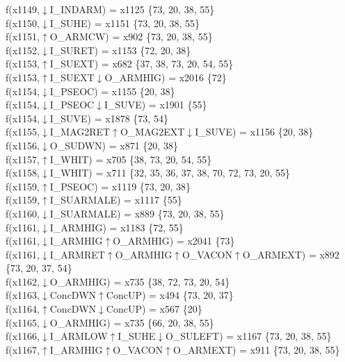 f(x1149,$\downarrow$I\_INDARM) = x1125 \{73, 20, 38, 55\} \\  
f(x1150,$\downarrow$I\_SUHE) = x1151 \{73, 20, 38, 55\} \\  
f(x1151,$\uparrow$O\_ARMCW) = x902 \{73, 20, 38, 55\} \\  
f(x1152,$\downarrow$I\_SURET) = x1153 \{72, 20, 38\} \\  
f(x1153,$\uparrow$I\_SUEXT) = x682 \{37, 38, 73, 20, 54, 55\} \\  
f(x1153,$\uparrow$I\_SUEXT$\downarrow$O\_ARMHIG) = x2016 \{72\} \\  
f(x1154,$\downarrow$I\_PSEOC) = x1155 \{20, 38\} \\  
f(x1154,$\downarrow$I\_PSEOC$\downarrow$I\_SUVE) = x1901 \{55\} \\  
f(x1154,$\downarrow$I\_SUVE) = x1878 \{73, 54\} \\  
f(x1155,$\downarrow$I\_MAG2RET$\uparrow$O\_MAG2EXT$\downarrow$I\_SUVE) = x1156 \{20, 38\} \\  
f(x1156,$\downarrow$O\_SUDWN) = x871 \{20, 38\} \\  
f(x1157,$\uparrow$I\_WHIT) = x705 \{38, 73, 20, 54, 55\} \\  
f(x1158,$\downarrow$I\_WHIT) = x711 \{32, 35, 36, 37, 38, 70, 72, 73, 20, 55\} \\  
f(x1159,$\uparrow$I\_PSEOC) = x1119 \{73, 20, 38\} \\  
f(x1159,$\uparrow$I\_SUARMALE) = x1117 \{55\} \\  
f(x1160,$\downarrow$I\_SUARMALE) = x889 \{73, 20, 38, 55\} \\  
f(x1161,$\downarrow$I\_ARMHIG) = x1183 \{72, 55\} \\  
f(x1161,$\downarrow$I\_ARMHIG$\uparrow$O\_ARMHIG) = x2041 \{73\} \\  
f(x1161,$\downarrow$I\_ARMRET$\uparrow$O\_ARMHIG$\uparrow$O\_VACON$\uparrow$O\_ARMEXT) = x892 \{73, 20, 37, 54\} \\  
f(x1162,$\downarrow$O\_ARMHIG) = x735 \{38, 72, 73, 20, 54\} \\  
f(x1163,$\downarrow$ConcDWN$\uparrow$ConcUP) = x494 \{73, 20, 37\} \\  
f(x1164,$\uparrow$ConcDWN$\downarrow$ConcUP) = x567 \{20\} \\  
f(x1165,$\downarrow$O\_ARMHIG) = x735 \{66, 20, 38, 55\} \\  
f(x1166,$\downarrow$I\_ARMLOW$\uparrow$I\_SUHE$\downarrow$O\_SULEFT) = x1167 \{73, 20, 38, 55\} \\  
f(x1167,$\uparrow$I\_ARMHIG$\uparrow$O\_VACON$\uparrow$O\_ARMEXT) = x911 \{73, 20, 38, 55\} \\  
